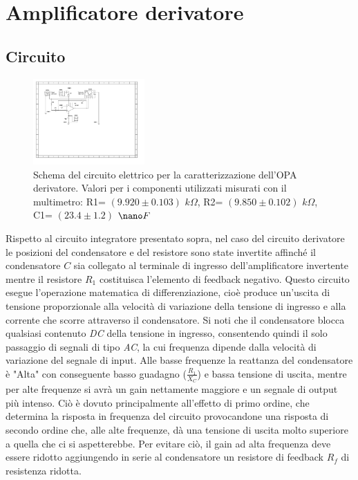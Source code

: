 \documentclass[journal]{IEEEtran}
\begin{document}
\section{\textbf{Amplificatore derivatore}} %
\subsection{\textbf{Circuito}}
\begin{figure}[H]%
\begin {center}
\includegraphics[width=0.38\textwidth]{sch-simulations/output/OPA-deriv.pdf}
\caption{Schema  del  circuito  elettrico  per  la  caratterizzazione  dell’OPA derivatore.  Valori  per  i  componenti  utilizzati  misurati  con  il  multimetro: R1= $(9.920 \pm 0.103)$ $k\Omega$, R2= $(9.850 \pm 0.102)$ $k\Omega$, C1= $(23.4 \pm 1.2)$ $\nano F$}
\label{fig:OPA-deriv}
\end {center}
\end{figure}
Rispetto al circuito integratore presentato sopra, nel caso del circuito derivatore le posizioni del condensatore e del resistore sono state invertite affinché il condensatore $C$ sia collegato al terminale di ingresso dell'amplificatore invertente mentre il resistore $R_1$ costituisca l'elemento di feedback negativo. Questo circuito esegue l'operazione matematica di differenziazione, cioè produce un'uscita di tensione proporzionale alla velocità di variazione della tensione di ingresso e alla corrente che scorre attraverso il condensatore. Si noti che il condensatore blocca qualsiasi contenuto \textit{DC} della tensione in ingresso, consentendo  quindi il solo passaggio di segnali di tipo \textit{AC}, la cui frequenza dipende dalla velocità di variazione del segnale di input. Alle basse frequenze la reattanza del condensatore è "Alta" con conseguente basso guadagno ($\frac{R_1}{X_C}$) e bassa tensione di uscita, mentre per alte frequenze si avrà un gain nettamente maggiore e un segnale di output più intenso. Ciò è dovuto principalmente all'effetto di primo ordine, che determina la risposta in frequenza del circuito provocandone una risposta di secondo ordine che, alle alte frequenze, dà una tensione di uscita molto superiore a quella che ci si aspetterebbe. Per evitare ciò, il gain ad alta frequenza deve essere ridotto aggiungendo in serie al condensatore un resistore di feedback $R_f$ di resistenza ridotta. 
\end{document}

